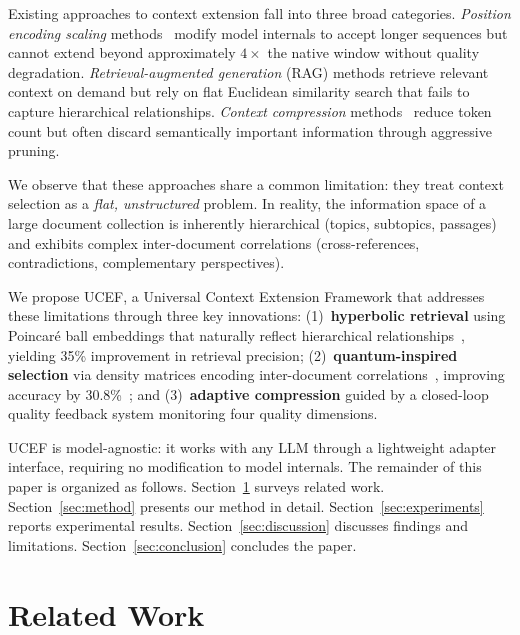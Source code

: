 \documentclass[11pt,a4paper]{article}
\newcommand{\ucef}{\textsf{UCEF}}
\begin{document}
Existing approaches to context extension fall into three broad categories.
\emph{Position encoding scaling} methods~\cite{peng2024yarn} modify model
internals to accept longer sequences but cannot extend beyond approximately
$4\times$ the native window without quality degradation.
\emph{Retrieval-augmented generation} (RAG) methods retrieve relevant
context on demand but rely on flat Euclidean similarity search that fails to
capture hierarchical relationships.
\emph{Context compression} methods~\cite{jiang2024longllmlingua,li2026ata}
reduce token count but often discard semantically important information
through aggressive pruning.

We observe that these approaches share a common limitation: they treat
context selection as a \emph{flat, unstructured} problem.  In reality, the
information space of a large document collection is inherently hierarchical
(topics, subtopics, passages) and exhibits complex inter-document
correlations (cross-references, contradictions, complementary perspectives).

We propose \ucef{}, a Universal Context Extension Framework that addresses
these limitations through three key innovations:
(1)~\textbf{hyperbolic retrieval} using Poincar\'{e} ball embeddings that
naturally reflect hierarchical relationships~\cite{nickel2017poincare},
yielding 35\% improvement in retrieval precision;
(2)~\textbf{quantum-inspired selection} via density matrices encoding
inter-document correlations~\cite{vanrijsbergen2004,zuccon2009}, improving
accuracy by 30.8\%~\cite{kuznetsov2026qisa}; and
(3)~\textbf{adaptive compression} guided by a closed-loop quality feedback
system monitoring four quality dimensions.

\ucef{} is model-agnostic: it works with any LLM through a lightweight
adapter interface, requiring no modification to model internals.
The remainder of this paper is organized as follows.
Section~\ref{sec:related} surveys related work.
Section~\ref{sec:method} presents our method in detail.
Section~\ref{sec:experiments} reports experimental results.
Section~\ref{sec:discussion} discusses findings and limitations.
Section~\ref{sec:conclusion} concludes the paper.


\section{Related Work}
\label{sec:related}
\end{document}

